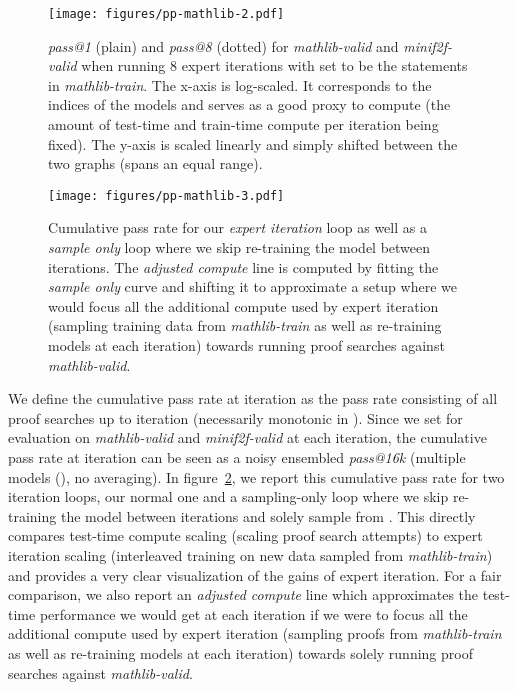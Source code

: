 \documentclass[nohyperref]{article}
\theoremstyle{plain}
\theoremstyle{definition}
\theoremstyle{remark}
\begin{document}
\begin{figure}[ht]
    \begin{center}
    \centerline{\texttt{[image: figures/pp-mathlib-2.pdf]}}
    \caption{\textit{pass@1} (plain) and \textit{pass@8} (dotted) for \textit{mathlib-valid} and \textit{minif2f-valid} when running 8 expert iterations with  set to be the statements in \textit{mathlib-train}. The x-axis is log-scaled. It corresponds to the indices of the  models and serves as a good proxy to compute (the amount of test-time and train-time compute per iteration being fixed). The y-axis is scaled linearly and simply shifted between the two graphs (spans an equal range).}
    \label{fig:pp-mathlib-2}
    \end{center}
\end{figure}

\begin{figure}[ht]
    \begin{center}
    \centerline{\texttt{[image: figures/pp-mathlib-3.pdf]}}
    \caption{Cumulative pass rate for our \textit{expert iteration} loop as well as a \textit{sample only} loop where we skip re-training the model between iterations. The \textit{adjusted compute} line is computed by fitting the \textit{sample only} curve and shifting it to approximate a setup where we would focus all the additional compute used by expert iteration (sampling training data from \textit{mathlib-train} as well as re-training models at each iteration) towards running proof searches against \textit{mathlib-valid}.}
    \label{fig:pp-mathlib-3}
    \end{center}
\end{figure}


We define the cumulative pass rate at iteration  as the pass rate consisting of all proof searches up to iteration  (necessarily monotonic in ). Since we set  for evaluation on \textit{mathlib-valid} and \textit{minif2f-valid} at each iteration, the cumulative pass rate at iteration  can be seen as a noisy ensembled \textit{pass@16k} (multiple models (), no averaging). In figure~\ref{fig:pp-mathlib-3}, we report this cumulative pass rate for two iteration loops, our normal one and a sampling-only loop where we skip re-training the model between iterations and solely sample from . This directly compares test-time compute scaling (scaling proof search attempts) to expert iteration scaling (interleaved training on new data sampled from \textit{mathlib-train}) and provides a very clear visualization of the gains of expert iteration. For a fair comparison, we also report an \textit{adjusted compute} line which approximates the test-time performance we would get at each iteration if we were to focus all the additional compute used by expert iteration (sampling proofs from \textit{mathlib-train} as well as re-training models at each iteration) towards solely running proof searches against \textit{mathlib-valid}. 
\end{document}

